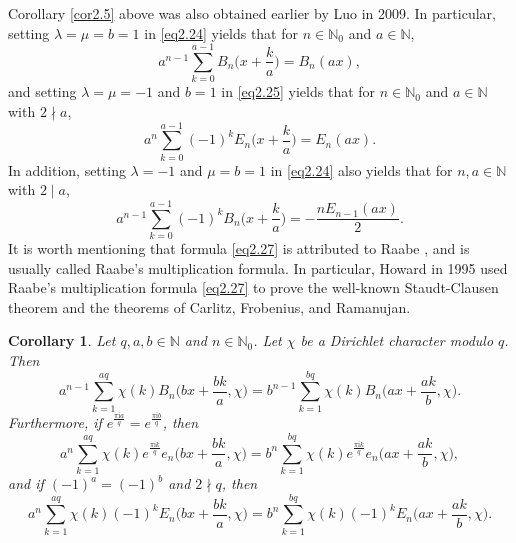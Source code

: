 \documentclass[reqno]{amsart}
\numberwithin{equation}{section}
\newtheorem{corollary}[thm]{Corollary}
\begin{document}
Corollary \ref{cor2.5} above was also obtained earlier by Luo \cite{luo1} in 2009. In particular, setting $\lambda=\mu=b=1$ in \eqref{eq2.24} yields that for $n\in\mathbb{N}_{0}$ and $a\in\mathbb{N}$,
\begin{equation}\label{eq2.27}
a^{n-1}\sum_{k=0}^{a-1}B_{n}\biggl(x+\frac{k}{a}\biggl)=B_{n}(ax),
\end{equation}
and setting $\lambda=\mu=-1$ and $b=1$ in \eqref{eq2.25} yields that for $n\in\mathbb{N}_{0}$ and $a\in\mathbb{N}$ with $2\nmid a$,
\begin{equation}\label{eq2.28}
a^{n}\sum_{k=0}^{a-1}(-1)^{k}E_{n}\biggl(x+\frac{k}{a}\biggl)=E_{n}(ax).
\end{equation}
In addition, setting $\lambda=-1$ and $\mu=b=1$ in \eqref{eq2.24} also yields that for $n,a\in\mathbb{N}$ with $2\mid a$,
\begin{equation}\label{eq2.29}
a^{n-1}\sum_{k=0}^{a-1}(-1)^{k}B_{n}\biggl(x+\frac{k}{a}\biggl)=-\frac{nE_{n-1}(ax)}{2}.
\end{equation}
It is worth mentioning that formula \eqref{eq2.27} is attributed to Raabe \cite{raabe}, and is usually called Raabe's multiplication formula. In particular, Howard \cite{howard} in 1995 used Raabe's multiplication formula \eqref{eq2.27} to prove the well-known Staudt-Clausen theorem and the theorems of Carlitz, Frobenius, and Ramanujan.

\begin{corollary}\label{cor2.6} Let $q,a,b\in\mathbb{N}$ and $n\in\mathbb{N}_{0}$. Let $\chi$ be a Dirichlet character modulo $q$. Then
\begin{equation}\label{eq2.30}
a^{n-1}\sum_{k=1}^{aq}\chi(k)B_{n}\biggl(bx+\frac{bk}{a},\chi\biggl)=b^{n-1}\sum_{k=1}^{bq}\chi(k)B_{n}\biggl(ax+\frac{ak}{b},\chi\biggl).
\end{equation}
Furthermore, if $e^{\frac{\pi \mathrm{i}a}{q}}=e^{\frac{\pi \mathrm{i}b}{q}}$, then
\begin{equation}\label{eq2.31}
a^{n}\sum_{k=1}^{aq}\chi(k)e^{\frac{\pi \mathrm{i}k}{q}}e_{n}\biggl(bx+\frac{bk}{a},\chi\biggl)=b^{n}\sum_{k=1}^{bq}\chi(k)e^{\frac{\pi \mathrm{i}k}{q}}e_{n}\biggl(ax+\frac{ak}{b},\chi\biggl),
\end{equation}
and if $(-1)^{a}=(-1)^{b}$ and $2\nmid q$, then
\begin{equation}\label{eq2.32}
a^{n}\sum_{k=1}^{aq}\chi(k)(-1)^{k}E_{n}\biggl(bx+\frac{bk}{a},\chi\biggl)=b^{n}\sum_{k=1}^{bq}\chi(k)(-1)^{k}E_{n}\biggl(ax+\frac{ak}{b},\chi\biggl).
\end{equation}
\end{corollary}
\end{document}
